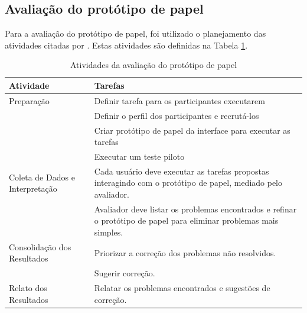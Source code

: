\begin{apendicesenv}
\newpage
\section{Avaliação do protótipo de papel}
\label{sec:aval_prototipo_papel}

{\color{textadded}
Para a avaliação do protótipo de papel, foi utilizado o planejamento das atividades citadas por . Estas atividades são definidas na Tabela \ref{tab:aval-prot-papel}.
}

\begin{table}[h!]
\centering
\caption{Atividades da avaliação do protótipo de papel \cite[p. 359]{barbosa_silva}}
\begin{tabular}{|p{5cm}|p{10.5cm}|}
\hline
{\color{textadded} \textbf{Atividade}}           & {\color{textadded} \textbf{Tarefas}}                                                                            \\ \hline
{\color{textadded}Preparação }                             & {\color{textadded} Definir tarefa para os participantes executarem}                                             \\ \cline{2-2} 
{\color{textadded} }                             & {\color{textadded} Definir o perfil dos participantes e recrutá-los}                                            \\ \cline{2-2} 
{\color{textadded} }                             & {\color{textadded} Criar protótipo de papel da interface para executar as tarefas}                              \\ \cline{2-2} 
 & {\color{textadded} Executar um teste piloto}   \\ \hline
{\color{textadded} Coleta de Dados e Interpretação}   & {\color{textadded} Cada usuário deve executar as tarefas propostas interagindo com o protótipo de papel, mediado pelo avaliador.}       \\ \cline{2-2} 
   & {\color{textadded} Avaliador deve listar os problemas encontrados e refinar o protótipo de papel para eliminar problemas mais simples.} \\ \hline
{\color{textadded} Consolidação dos Resultados}& {\color{textadded}Priorizar a correção dos problemas não resolvidos.}                                                                  \\ \cline{2-2} 
       & {\color{textadded}Sugerir correção.}                                                                                                   \\ \hline
{\color{textadded}Relato dos Resultados}                               & {\color{textadded}Relatar os problemas encontrados e sugestões de correção.}                                                           \\ \hline
\end{tabular}
\label{tab:aval-prot-papel}
\end{table}


\end{apendicesenv}
